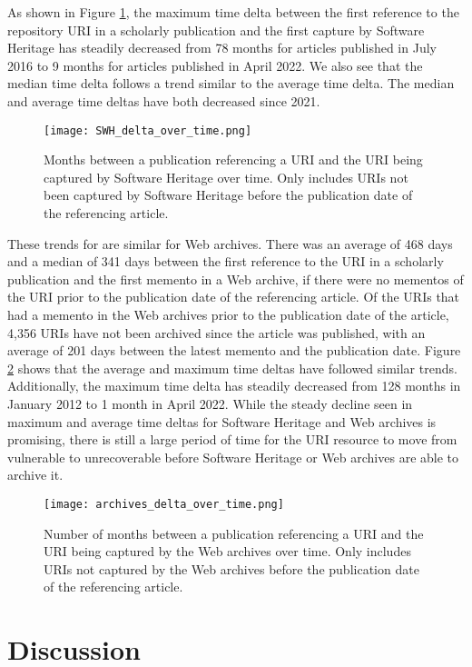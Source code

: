 As shown in Figure \ref{fig:swh_delta},
the maximum time delta between the first reference to the repository URI in a scholarly publication and the first capture by Software Heritage has steadily decreased from 78 months for articles published in July 2016 to 9 months for articles published in April 2022. We also see that the median time delta follows a trend similar to the average time delta. The median and average time deltas have both decreased since 2021. 

\begin{figure}
    \centering
    \texttt{[image: SWH\_delta\_over\_time.png]}
    \caption{Months between a publication referencing a URI and the URI being captured by Software Heritage over time. Only includes URIs not been captured by Software Heritage before the publication date of the referencing article.}
    \label{fig:swh_delta}
\end{figure}

These trends for are similar for Web archives. There was an average of 468 days and a median of 341 days between the first reference to the URI in a scholarly publication and the first memento in a Web archive, if there were no mementos of the URI prior to the publication date of the referencing article. Of the URIs that had a memento in the Web archives prior to the publication date of the article, 4,356 URIs have not been archived since the article was published, with an average of 201 days between the latest memento and the publication date. Figure \ref{fig:timemap_delta} shows that the average and maximum time deltas have followed similar trends. Additionally, the maximum time delta has steadily decreased from 128 months in January 2012 to 1 month in April 2022. While the steady decline seen in maximum and average time deltas for Software Heritage and Web archives is promising, there is still a large period of time for the URI resource to move from  vulnerable to unrecoverable before Software Heritage or Web archives are able to archive it.

\begin{figure}
    \centering
    \texttt{[image: archives\_delta\_over\_time.png]}
    \caption{Number of months between a publication referencing a URI and the URI being captured by the Web archives over time. Only includes URIs not captured by the Web archives before the publication date of the referencing article.}
    \label{fig:timemap_delta}
\end{figure}

\section{Discussion}

